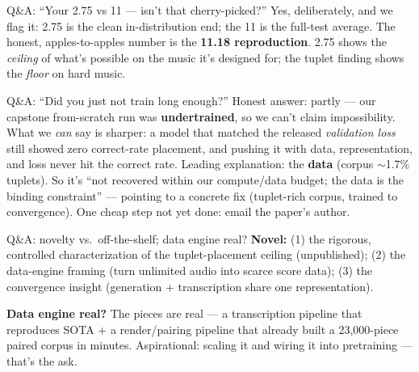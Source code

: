 \documentclass[aspectratio=169,11pt]{beamer}
\begin{document}
\begin{frame}{Q\&A: ``Your 2.75 vs 11 --- isn't that cherry-picked?''}
  \footnotesize
  Yes, deliberately, and we flag it: 2.75 is the clean in-distribution end; the 11 is the full-test average. The honest, apples-to-apples number is the \textbf{11.18 reproduction}. 2.75 shows the \emph{ceiling} of what's possible on the music it's designed for; the tuplet finding shows the \emph{floor} on hard music.
\end{frame}

\begin{frame}{Q\&A: ``Did you just not train long enough?''}
  \footnotesize
  Honest answer: partly --- our capstone from-scratch run was \textbf{undertrained}, so we can't claim impossibility. What we \emph{can} say is sharper: a model that matched the released \emph{validation loss} still showed zero correct-rate placement, and pushing it with data, representation, and loss never hit the correct rate. Leading explanation: the \textbf{data} (corpus $\sim$1.7\% tuplets). So it's ``not recovered within our compute/data budget; the data is the binding constraint'' --- pointing to a concrete fix (tuplet-rich corpus, trained to convergence). One cheap step not yet done: email the paper's author.
\end{frame}

\begin{frame}{Q\&A: novelty vs.\ off-the-shelf; data engine real?}
  \footnotesize
  \textbf{Novel:} (1) the rigorous, controlled characterization of the tuplet-placement ceiling (unpublished); (2) the data-engine framing (turn unlimited audio into scarce score data); (3) the convergence insight (generation + transcription share one representation).\par\medskip
  \textbf{Data engine real?} The pieces are real --- a transcription pipeline that reproduces SOTA + a render/pairing pipeline that already built a 23{,}000-piece paired corpus in minutes. Aspirational: scaling it and wiring it into pretraining --- that's the ask.
\end{frame}
\end{document}
